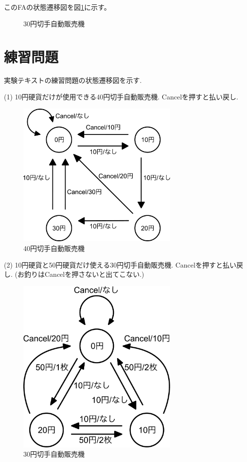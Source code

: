\documentclass[titlepage]{jsarticle}
\begin{document}
        このFAの状態遷移図を図\ref{fig:例状態遷移図}に示す。

        \begin{figure}[ht]
            \centering
            
            \caption{30円切手自動販売機}
            \label{fig:例状態遷移図}
        \end{figure}

\section{練習問題}
    実験テキストの練習問題の状態遷移図を示す.

    (1) 10円硬貨だけが使用できる40円切手自動販売機. Cancelを押すと払い戻し.

    \begin{figure}[ht]
        \centering
        \includegraphics[width=8cm]{images/40.pdf}
        \caption{40円切手自動販売機}
        \label{fig:40状態遷移図}
    \end{figure}

    (2) 10円硬貨と50円硬貨だけ使える30円切手自動販売機. Cancelを押すと払い戻し.
    (お釣りはCancelを押さないと出てこない.)

    \begin{figure}[ht]
        \centering
        \includegraphics[width=8cm]{images/30.pdf}
        \caption{30円切手自動販売機}
        \label{fig:30状態遷移図}
    \end{figure}
\end{document}
